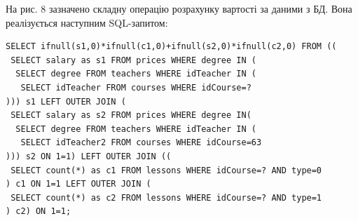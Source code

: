 На рис. 8 зазначено складну операцію розрахунку вартості за даними з БД. Вона реалізується наступним SQL-запитом:
{ \fontsize{10pt}{12pt} \selectfont
\begin{verbatim}
SELECT ifnull(s1,0)*ifnull(c1,0)+ifnull(s2,0)*ifnull(c2,0) FROM ((
 SELECT salary as s1 FROM prices WHERE degree IN (
  SELECT degree FROM teachers WHERE idTeacher IN (
   SELECT idTeacher FROM courses WHERE idCourse=?
))) s1 LEFT OUTER JOIN (
 SELECT salary as s2 FROM prices WHERE degree IN(
  SELECT degree FROM teachers WHERE idTeacher IN (
   SELECT idTeacher2 FROM courses WHERE idCourse=63
))) s2 ON 1=1) LEFT OUTER JOIN ((
 SELECT count(*) as c1 FROM lessons WHERE idCourse=? AND type=0
) c1 ON 1=1 LEFT OUTER JOIN (
 SELECT count(*) as c2 FROM lessons WHERE idCourse=? AND type=1
) c2) ON 1=1;
\end{verbatim}
}

